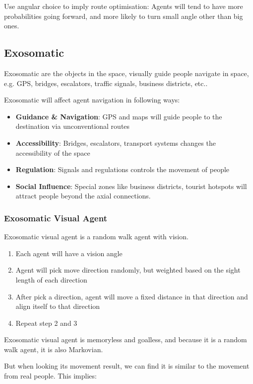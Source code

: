 \documentclass[a4paper, openany]{book}
\begin{document}
Use angular choice to imply route optimisation: Agents will tend to have more probabilities going forward, and more likely to turn small angle other than big ones.

\subsection{Exosomatic}

Exosomatic are the objects in the space, visually guide people navigate in space, e.g. GPS, bridges, escalators, traffic signals, business districts, etc..

Exosomatic will affect agent navigation in following ways:

\begin{itemize}
  \item \textbf{Guidance \& Navigation}: GPS and maps will guide people to the destination via unconventional routes
  \item \textbf{Accessibility}: Bridges, escalators, transport systems changes the accessibility of the space
  \item \textbf{Regulation}: Signals and regulations controls the movement of people
  \item \textbf{Social Influence}: Special zones like business districts, tourist hotspots will attract people beyond the axial connections.
\end{itemize}

\subsubsection{Exosomatic Visual Agent}

Exosomatic visual agent is a random walk agent with vision.

\begin{enumerate}
  \item Each agent will have a vision angle
  \item Agent will pick move direction randomly, but weighted based on the sight length of each direction
  \item After pick a direction, agent will move a fixed distance in that direction and align itself to that direction
  \item Repeat step 2 and 3
\end{enumerate}

Exosomatic visual agent is memoryless and goalless, and because it is a random walk agent, it is also Markovian.

But when looking its movement result, we can find it is similar to the movement from real people. This implies:
\end{document}
